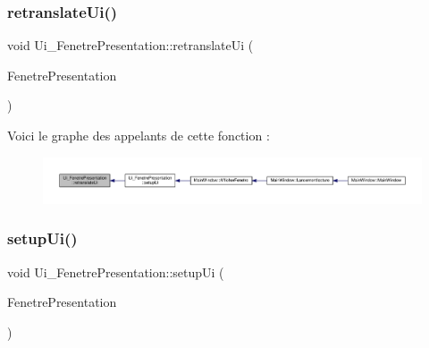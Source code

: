 \subsubsection{\texorpdfstring{retranslate\+Ui()}{retranslateUi()}}
{\footnotesize\ttfamily void Ui\+\_\+\+Fenetre\+Presentation\+::retranslate\+Ui (\begin{DoxyParamCaption}\item[{Q\+Widget $\ast$}]{Fenetre\+Presentation }\end{DoxyParamCaption})\hspace{0.3cm}{\ttfamily [inline]}}

Voici le graphe des appelants de cette fonction \+:
\nopagebreak
\begin{figure}[H]
\begin{center}
\leavevmode
\includegraphics[width=350pt]{class_ui___fenetre_presentation_a14a00db87b3b4ce5a1e3df9f754e19bb_icgraph}
\end{center}
\end{figure}
\mbox{\label{class_ui___fenetre_presentation_a08e799fcf97f8afe980e76770b4ef960}} 
\subsubsection{\texorpdfstring{setup\+Ui()}{setupUi()}}
{\footnotesize\ttfamily void Ui\+\_\+\+Fenetre\+Presentation\+::setup\+Ui (\begin{DoxyParamCaption}\item[{Q\+Widget $\ast$}]{Fenetre\+Presentation }\end{DoxyParamCaption})\hspace{0.3cm}{\ttfamily [inline]}}

